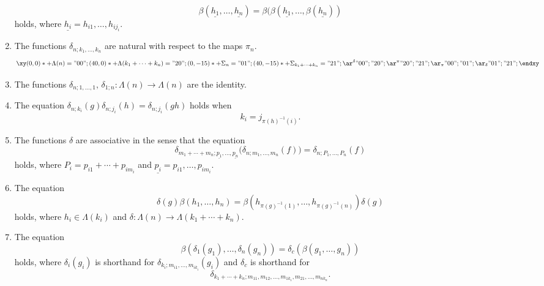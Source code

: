 \documentclass{amsbook} %
\numberwithin{section}{chapter}
\begin{document}
\begin{thm}
\begin{enumerate}
\[
  \beta(\underline{h_1},\ldots,\underline{h_n}) = \beta(\beta(\underline{h_1},\ldots,\beta(\underline{h_n}))
\]
holds, where $\underline{h_i} = h_{i1},\ldots,h_{ij_i}$.
\item\label{eq4} The functions $\delta_{n; k_{1}, \ldots, k_{n}}$ are natural with respect to the maps $\pi_{n}$.
\[
\xy
(0,0)*+{\Lambda(n)} ="00";
(40,0)*+{\Lambda(k_{1} + \cdots + k_{n}) } ="20";
(0,-15)*+{\Sigma_{n}  } ="01";
(40,-15)*+{\Sigma_{k_{1} + \cdots + k_{n}} } ="21";
{\ar^{\delta} "00" ; "20"};
{\ar^{\pi} "20" ; "21"};
{\ar_{\pi} "00" ; "01"};
{\ar_{\delta} "01" ; "21"};
\endxy
\]
\item\label{eq5} The functions $\delta_{n; 1, \ldots, 1}, \, \delta_{1;n} : \Lambda(n) \to \Lambda(n)$ are the identity.
\item\label{eq6} The equation $\delta_{n; k_{i}}(g) \delta_{n; j_{i}}(h) = \delta_{n; j_{i}}(gh)$ holds when
\[
k_{i} = j_{\pi(h)^{-1}(i)}.
\]
\item\label{eq7} The functions $\delta$ are associative in the sense that the equation
\[
\delta_{m_1 + \cdots + m_n; \underline{p_1},\ldots,\underline{p_n}}\big( \delta_{n; m_{1}, \ldots, m_{n}}(f) \big) = \delta_{n; P_{1}, \ldots, P_{n}}(f)
\]
holds, where $P_{i} = p_{i1} + \cdots + p_{im_{i}}$ and $\underline{p_i} = p_{i1}, \ldots, p_{im_i}$.
\item\label{eq8} The equation
\[
\delta(g) \beta(h_{1}, \ldots, h_{n}) = \beta(h_{\pi(g)^{-1}(1)}, \ldots,  h_{\pi(g)^{-1}(n)}) \delta(g)
\]
holds, where $h_{i} \in \Lambda(k_{i})$ and $\delta:\Lambda(n) \rightarrow \Lambda(k_{1} + \cdots + k_{n})$.
\item\label{eq9} The equation
\[
\beta(\delta_{1}(g_{1}), \ldots, \delta_{n}(g_{n})) = \delta_{c}(\beta(g_{1}, \ldots, g_{n}))
\]
holds, where $\delta_{i}(g_{i})$ is shorthand for $\delta_{k_{i}; m_{i1}, \ldots, m_{ik_{i}}}(g_{i})$ and $\delta_{c}$ is shorthand for
\[
\delta_{k_{1}+\cdots + k_{n}; m_{11}, m_{12}, \ldots, m_{1k_{1}}, m_{21}, \ldots, m_{nk_{n}}}.
\]
\end{enumerate}
\end{thm}
\end{document}
